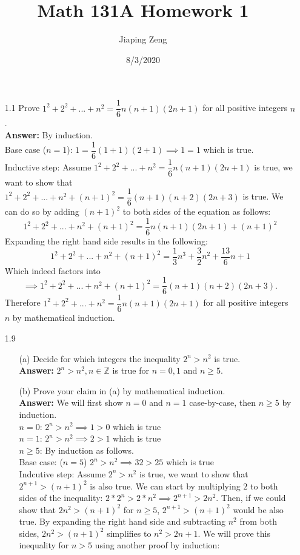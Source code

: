 \documentclass{article}
\title{Math 131A Homework 1}
\date{8/3/2020}
\author{Jiaping Zeng}
\begin{document}
\maketitle

\begin{itemize}
    \item [1.1] Prove $1^2+2^2+...+n^2=\dfrac{1}{6}n(n+1)(2n+1)$ for all positive integers $n$.\\\textbf{Answer: } By induction. \\
          Base case ($n=1$): $1=\dfrac{1}{6}(1+1)(2+1)\implies1=1$ which is true. \\
          Inductive step: Assume $1^2+2^2+...+n^2=\dfrac{1}{6}n(n+1)(2n+1)$ is true, we want to show that $1^2+2^2+...+n^2+(n+1)^2=\dfrac{1}{6}(n+1)(n+2)(2n+3)$ is true. We can do so by adding $(n+1)^2$ to both sides of the equation as follows:
          \[1^2+2^2+...+n^2+(n+1)^2=\dfrac{1}{6}n(n+1)(2n+1)+(n+1)^2\]
          Expanding the right hand side results in the following:
          \[1^2+2^2+...+n^2+(n+1)^2=\dfrac{1}{3}n^3+\dfrac{3}{2}n^2+\dfrac{13}{6}n+1\]
          Which indeed factors into
          \[\implies1^2+2^2+...+n^2+(n+1)^2=\dfrac{1}{6}(n+1)(n+2)(2n+3).\]
          Therefore $1^2+2^2+...+n^2=\dfrac{1}{6}n(n+1)(2n+1)$ for all positive integers $n$ by mathematical induction.
    \item [1.9]
          \begin{itemize}
              \item [(a)] Decide for which integers the inequality $2^n>n^2$ is true.\\
                    \textbf{Answer: } $2^n>n^2, n\in\mathbb{Z}$ is true for $n=0,1$ and $n\geq 5$.
              \item [(b)] Prove your claim in (a) by mathematical induction.\\
                    \textbf{Answer: } We will first show $n=0$ and $n=1$ case-by-case, then $n\geq 5$ by induction.\\
                    $n=0$: $2^n>n^2\implies 1>0$ which is true\\
                    $n=1$: $2^n>n^2\implies 2>1$ which is true\\
                    $n\geq 5$: By induction as follows.\\
                    Base case: ($n=5$) $2^n>n^2\implies 32>25$ which is true\\
                    Indcutive step: Assume $2^n>n^2$ is true, we want to show that $2^{n+1}>(n+1)^2$ is also true. We can start by multiplying $2$ to both sides of the inequality: $2*2^n>2*n^2\implies 2^{n+1}>2n^2$. Then, if we could show that $2n^2>(n+1)^2$ for $n\geq 5$, $2^{n+1}>(n+1)^2$ would be also true. By expanding the right hand side and subtracting $n^2$ from both sides, $2n^2>(n+1)^2$ simplifies to $n^2>2n+1$. We will prove this inequality for $n>5$ using another proof by induction: \begin{itemize}

\end{itemize}
\end{itemize}
\end{itemize}
\end{document}
